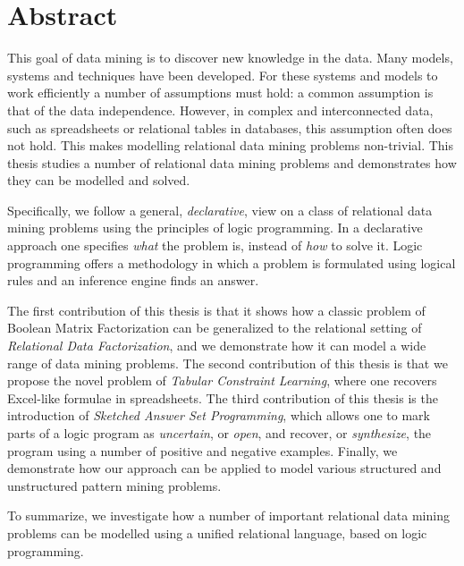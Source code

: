 \chapter{Abstract} \label{ch:abstract}
This goal of data mining is to discover new knowledge in the data. Many models, systems and techniques have been developed. For these systems and models to work efficiently a number of assumptions must hold: a common assumption is that of the data independence. However, in complex and interconnected data, such as spreadsheets or relational tables in databases, this assumption often does not hold. This makes modelling relational data mining problems non-trivial. This thesis studies a number of relational data mining problems and demonstrates how they can be modelled and solved.

Specifically, we follow a general, \textit{declarative}, view on a
class of relational data mining problems using the principles of logic
programming. In a declarative approach one specifies \textit{what} the
problem is, instead of \textit{how} to solve it. Logic programming offers a methodology in which a problem is formulated using logical rules and an inference engine finds an answer. 

The first contribution of this thesis is that it shows how a classic
problem of Boolean Matrix Factorization can be generalized to the
relational setting of \textit{Relational Data Factorization}, and we
demonstrate how it can model a wide range of data mining problems. The
second contribution of this thesis is that we propose the novel
problem of \textit{Tabular Constraint Learning}, where one recovers
Excel-like formulae in spreadsheets. The third contribution of this
thesis is the introduction of \textit{Sketched Answer Set
Programming}, which allows one to mark parts of a logic program as
\textit{uncertain}, or \textit{open}, and recover, or
\textit{synthesize}, the program using a number of positive and
negative examples. Finally, we demonstrate how our approach can be
applied to model various structured and unstructured pattern mining
problems.

To summarize, we investigate how a number of important relational data
mining problems can be modelled using a unified relational language, based on logic programming. 

\cleardoublepage

